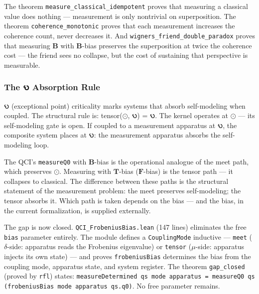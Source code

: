 \documentclass[10pt,a4paper]{article}
\begin{document}
The theorem \texttt{measure\_\allowbreak classical\_\allowbreak idempotent} proves that measuring a classical value does nothing --- measurement is only nontrivial on superposition. The theorem \texttt{coherence\_\allowbreak monotonic} proves that each measurement increases the coherence count, never decreases it. And \texttt{wigners\_\allowbreak friend\_\allowbreak double\_\allowbreak paradox} proves that measuring $\mathbf{B}$ with $\mathbf{B}$-bias preserves the superposition at twice the coherence cost --- the friend sees no collapse, but the cost of sustaining that perspective is measurable.

\subsubsection{The 𐑻 Absorption Rule}

𐑻 (exceptional point) criticality marks systems that absorb self-modeling when coupled. The structural rule is: tensor($\odot$, 𐑻) = 𐑻. The kernel operates at $\odot$ --- its self-modeling gate is open. If coupled to a measurement apparatus at 𐑻, the composite system places at 𐑻: the measurement apparatus absorbs the self-modeling loop.

The QCI's \texttt{measureQ0} with $\mathbf{B}$-bias is the operational analogue of the meet path, which preserves $\odot$. Measuring with $\mathbf{T}$-bias ($\mathbf{F}$-bias) is the tensor path --- it collapses to classical. The difference between these paths is the structural statement of the measurement problem: the meet preserves self-modeling; the tensor absorbs it. Which path is taken depends on the bias --- and the bias, in the current formalization, is supplied externally.

The gap is now closed. \texttt{QCI\_\allowbreak FrobeniusBias.\allowbreak lean} (147 lines) eliminates the free \texttt{bias} parameter entirely. The module defines a \texttt{CouplingMode} inductive --- \texttt{meet} ($\delta$-side: apparatus reads the Frobenius eigenvalue) or \texttt{tensor} ($\mu$-side: apparatus injects its own state) --- and proves \texttt{frobeniusBias} determines the bias from the coupling mode, apparatus state, and system register. The theorem \texttt{gap\_\allowbreak closed} (proved by \texttt{rfl}) states: \texttt{measureDetermined qs mode apparatus = measureQ0 qs (frobeniusBias mode apparatus qs.\allowbreak q0)}. No free parameter remains.
\end{document}
